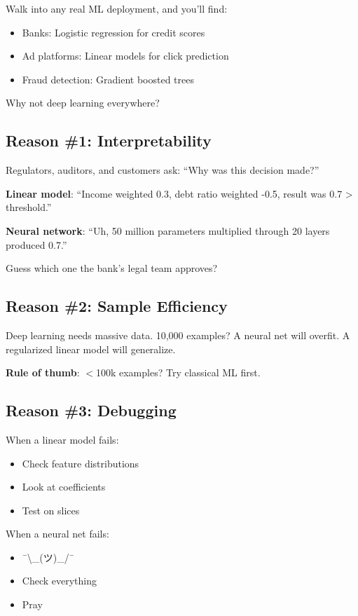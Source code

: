 \documentclass[11pt,oneside]{book}
\begin{document}
Walk into any real ML deployment, and you'll find:
\begin{itemize}
    \item Banks: Logistic regression for credit scores
    \item Ad platforms: Linear models for click prediction
    \item Fraud detection: Gradient boosted trees
\end{itemize}

Why not deep learning everywhere?

\subsection{Reason \#1: Interpretability}

Regulators, auditors, and customers ask: ``Why was this decision made?''

\textbf{Linear model}: ``Income weighted 0.3, debt ratio weighted -0.5, result was 0.7 > threshold.''

\textbf{Neural network}: ``Uh, 50 million parameters multiplied through 20 layers produced 0.7.''

Guess which one the bank's legal team approves?

\subsection{Reason \#2: Sample Efficiency}

Deep learning needs massive data. 10,000 examples? A neural net will overfit. A regularized linear model will generalize.

\begin{asidebox}
\textbf{Rule of thumb}: $<$100k examples? Try classical ML first.
\end{asidebox}

\subsection{Reason \#3: Debugging}

When a linear model fails:
\begin{itemize}
    \item Check feature distributions
    \item Look at coefficients
    \item Test on slices
\end{itemize}

When a neural net fails:
\begin{itemize}
    \item ¯\textbackslash\_(ツ)\_/¯
    \item Check everything
    \item Pray
\end{itemize}
\end{document}
